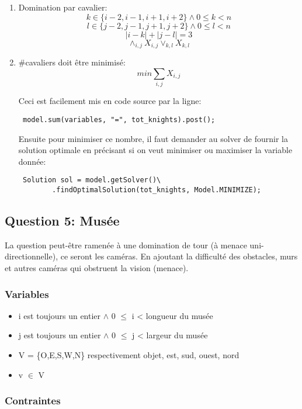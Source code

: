 \begin{enumerate}
    \item Domination par cavalier:
    \[  k \in \{i-2, i-1, i+1, i+2\} \land 0 \leq k < n \]
    \[  l \in \{j-2, j-1, j+1, j+2\} \land 0 \leq l < n \]
    \[  |i-k| + |j-l| = 3 \]
    \[  \land_{i,j} X_{i,j} \lor_{k,l} X_{k,l} \]
    
    \item \#cavaliers doit être minimisé:
    \[  min \sum_{i,j} X_{i,j} \]
    
    Ceci est facilement mis en code source par la ligne:
    \begin{verbatim} model.sum(variables, "=", tot_knights).post(); \end{verbatim}
    
    Ensuite pour minimiser ce nombre, il faut demander au solver de fournir la solution optimale en précisant si on veut minimiser ou maximiser la variable donnée:
    \begin{verbatim} Solution sol = model.getSolver()\
        .findOptimalSolution(tot_knights, Model.MINIMIZE); \end{verbatim}
\end{enumerate}



\subsection{Question 5: Musée}
La question peut-être ramenée à une domination de tour (à menace uni-directionnelle), ce seront les caméras. En ajoutant la difficulté des obstacles, murs et autres caméras qui obstruent la vision (menace).\\

\subsubsection{Variables}

\begin{itemize}
    \item i est toujours un entier $\land$ 0 $\leq$ i < longueur du musée
    \item j est toujours un entier $\land$ 0 $\leq$ j < largeur du musée
    \item V = \{O,E,S,W,N\} respectivement objet, est, sud, ouest, nord
    \item v $\in$ V
\end{itemize}


\subsubsection{Contraintes}


